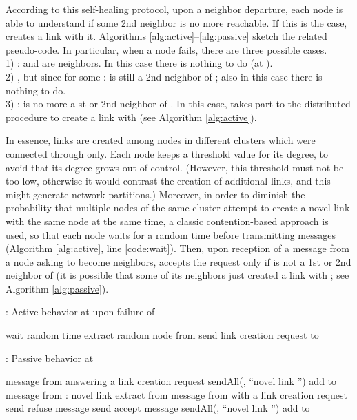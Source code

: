 \documentclass[10pt, conference, compsocconf]{IEEEtran}
\begin{document}
According to this self-healing protocol, upon a neighbor departure, each node  is able to understand if some 2nd neighbor is no more reachable. 
If this is the case,  creates a link with it.
Algorithms \ref{alg:active}--\ref{alg:passive} sketch the related pseudo-code.
In particular, when a node  fails,  there are three possible cases.\\
1)  :  and  are neighbors. In this case there is nothing to do (at ).\\
2) , but  since  for some :  is still a 2nd neighbor of ; also in this case there is nothing to do.\\
3)  :  is no more a st or 2nd neighbor of . In this case,  takes part to the distributed procedure to create a link with  (see Algorithm \ref{alg:active}).

In essence, links are created among nodes in different clusters which were connected through  only.
Each node  keeps a threshold value for its degree, to avoid that its degree grows out of control. (However, this threshold must not be too low, otherwise it would contrast the creation of additional links, and this might generate network partitions.)
Moreover, in order to diminish the probability that multiple nodes of the same cluster attempt to create a novel link with the same node  at the same time, a classic contention-based approach is used, so that each node  waits for a random time before transmitting messages (Algorithm \ref{alg:active}, line \ref{code:wait}). 
Then, upon reception of a message from a node  asking  to become neighbors,  accepts the request only if  is not a 1st or 2nd neighbor of  (it is possible that some of its neighbors just created a link with ; see Algorithm \ref{alg:passive}).

\begin{algorithm}[htbp]
\caption{: Active behavior at  upon failure of }
\label{alg:active}
\begin{algorithmic}[1]
\State 
\Statex
\While {(}\label{code:control}
  \State wait random time \label{code:wait}
  \State  extract random node from  \label{code:extract}
  \State send link creation request to \label{code:req}
\EndWhile
\end{algorithmic}
\end{algorithm}
\begin{algorithm}
\caption{: Passive behavior at }
\label{alg:passive}
\begin{algorithmic}[1]
\Require message from  answering a link creation request
  \label{code:ans_b}
    \State sendAll(, ``novel link '')
\State add  to 
  \EndIf\label{code:ans_e}
\Statex 
\Require message from : novel link 
  \State extract  from \label{code:l_creation}
\Statex 
\Require message from  with a link creation request
  \If{}\label{code:l_creat_req_b}
    \State send refuse message
  \Else
    \State send accept message
    \State sendAll(, ``novel link '')
\State add  to 
  \EndIf\label{code:l_creat_req_e}
\end{algorithmic}
\end{algorithm}
\end{document}
